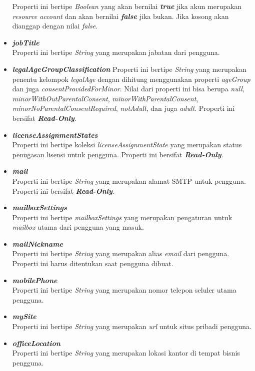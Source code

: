 \begin{itemize}
	Properti ini bertipe \textit{Boolean} yang akan bernilai \textbf{\textit{true}} jika akun merupakan \textit{resource account} dan akan bernilai \textbf{\textit{false}} jika bukan. Jika kosong akan dianggap dengan nilai \textit{false}.
	\item \textbf{\textit{jobTitle}}\\
	Properti ini bertipe \textit{String} yang merupakan jabatan dari pengguna.
	\item \textbf{\textit{legalAgeGroupClassification}}
	Properti ini bertipe \textit{String} yang merupakan penentu kelompok \textit{legalAge} dengan dihitung menggunakan properti \textit{ageGroup} dan juga \textit{consentProvidedForMinor}. Nilai dari properti ini bisa berupa \textit{null}, \textit{minorWithOutParentalConsent}, \textit{minorWithParentalConsent}, \textit{minorNoParentalConsentRequired}, \textit{notAdult}, dan juga \textit{adult}. Properti ini bersifat \textbf{\textit{Read-Only}}.
	 \item \textbf{\textit{licenseAssignmentStates}}\\
	Properti ini bertipe koleksi \textit{licenseAssignmentState} yang merupakan status penugasan lisensi untuk pengguna. Properti ini bersifat \textbf{\textit{Read-Only}}.
	\item \textbf{\textit{mail}}\\
	Properti ini bertipe \textit{String} yang merupakan alamat SMTP untuk pengguna. Properti ini bersifat \textbf{\textit{Read-Only}}.
	\item \textbf{\textit{mailboxSettings}}\\
	Properti ini bertipe \textit{mailboxSettings} yang merupakan pengaturan untuk \textit{mailbox} utama dari pengguna yang masuk.
	\item \textbf{\textit{mailNickname}}\\
	Properti ini bertipe \textit{String} yang merupakan alias \textit{email} dari pengguna. Properti ini harus ditentukan saat pengguna dibuat. 
	\item \textbf{\textit{mobilePhone}}\\
	Properti ini bertipe \textit{String} yang merupakan nomor telepon seluler utama pengguna.
	\item \textbf{\textit{mySite}}\\
	Properti ini bertipe \textit{String} yang merupakan \textit{url} untuk situs pribadi pengguna.
	\item \textbf{\textit{officeLocation}}\\
	Properti ini bertipe \textit{String} yang merupakan lokasi kantor di tempat bisnis pengguna.

\end{itemize}
